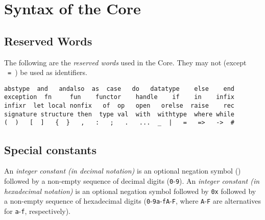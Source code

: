 \section{Syntax of the Core}
\label{syn-core-sec}

\subsection{Reserved Words}
The
following are the {\sl reserved words} used in the Core.   They
may not (except ~{\tt =}~) be used as identifiers.   


\vspace*{-6pt}
\begin{verbatim}
abstype  and   andalso  as  case   do   datatype    else    end
exception  fn     fun    functor    handle    if    in    infix
infixr  let local nonfix   of  op   open   orelse  raise    rec 
signature structure then  type val  with  withtype  where while  
(  )   [  ]   {  }   ,   :   ;   .   ...  _  |   =   =>   ->  #     
\end{verbatim}
\vspace*{-6pt}
\subsection{Special constants}
\label{cr:speccon}

An  {\sl integer constant (in decimal notation)} is an optional
negation symbol (\tttilde) followed by a non-empty sequence of decimal digits
(\verb+0+-\verb+9+). 
An {\sl integer constant (in hexadecimal notation)} is an optional
negation symbol followed by \verb+0x+ followed by a non-empty sequence of
hexadecimal digits (\verb+0+-\verb+9+\verb+a+-\verb+f+\verb+A+-\verb+F+, where 
\verb+A+-\verb+F+ are alternatives for \verb+a+-\verb+f+,
respectively).

